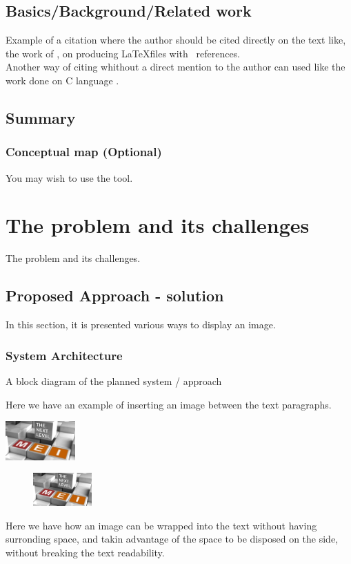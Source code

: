 \documentclass[
  oneside,
  11pt, a4paper,
  footinclude=true,
  headinclude=true,
  cleardoublepage=empty
]{scrbook}
\begin{document}
	\section{Basics/Background/Related work}
	Example of a citation where the author should be cited directly on the text like, the work of \cite{GRM97}, on producing \LaTeX files with \Bibtex\ references. \\
	Another way of citing whithout a direct mention to the author can used like the work done on C language \citep{KeR88}.

     \section{Summary}
     	\subsection{Conceptual map (Optional)}
	You may wish to use the  tool.



	\chapter{The problem and its challenges}
	         The problem and its challenges.

	\section{Proposed Approach - solution}
	In this section, it is presented various ways to display an image.
     \subsection{System Architecture}
     A block diagram of the planned system / approach

	Here we have an example of inserting an image between the text paragraphs.
	\begin{center}
		\includegraphics[width=0.2\textwidth]{img/mei-logo-03.jpg}
	\end{center}

	\begin{figure}	
		\includegraphics[width=0.2\textwidth]{img/mei-logo-03.jpg}
	\end{figure}
	Here we have how an image can be wrapped into the text without having surronding space, and takin advantage of the space to be disposed on the side, without breaking the text readability.
\end{document}
